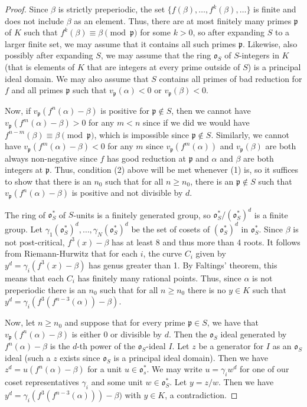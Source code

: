 \documentclass[10pt,a4paper]{amsart}
\newcommand{\fo}{\ensuremath{{\mathfrak{o}}}}
\newcommand{\fp}{\ensuremath{{\mathfrak{p}}}}
\begin{document}
\begin{proof}
  Since $\beta$ is strictly preperiodic, the set $\{ f(\beta), \dots,
  f^k(\beta), \dots \}$ is finite and does not include $\beta$ as an
  element.  Thus, there are at most finitely many primes $\fp$ of $K$
  such that $f^k(\beta) \equiv \beta \pmod {\fp}$ for some $k >
  0$, so after expanding $S$ to a larger finite set, we may assume
  that it contains all such primes $\fp$.  Likewise, also possibly
  after expanding $S$, we may assume that the ring $\fo_S$ of
  $S$-integers in $K$ (that is elements of $K$ that are integers at
  every prime outside of $S$) is a principal ideal domain.  We may
  also assume that $S$ contains all primes of bad reduction for $f$
  and all primes $\fp$ such that $v_\fp(\alpha) < 0$ or $v_\fp(\beta)
  < 0$.  

  Now, if $v_\fp(f^n(\alpha) - \beta)$ is positive  for $\fp
  \notin S$, then we cannot have $v_\fp(f^m(\alpha) - \beta) >
  0$ for any $m < n$ since if we did we would have $f^{n-m}(\beta)
  \equiv \beta \pmod{\fp}$, which is impossible since $\fp \notin
  S$. Similarly, we cannot have $v_\fp(f^m(\alpha) - \beta) <  0$ for
  any $m$ since $v_\fp(f^m(\alpha))$ and $v_\fp(\beta)$ are both always
  non-negative since $f$ has good reduction at $\fp$ and $\alpha$ and
  $\beta$ are both integers at $\fp$.  Thus, condition (2) above will
  be met whenever (1) is, so it suffices to show that there is an
  $n_0$ such that for all $n \geq n_0$, there is an $\fp \notin S$
  such that $v_\fp(f^n(\alpha) - \beta)$ is positive and not
  divisible by $d$.

  The ring of $\fo_S^*$ of $S$-units is a finitely generated group, so
  $\fo_S^* / (\fo_S^*)^d$ is a finite group.  Let
  $\gamma_1(\fo_S^*)^d, \dots, \gamma_N(\fo_S^*)^d$ be
  the set of cosets of $(\fo_S^*)^d$ in $\fo_S^*$.  Since
  $\beta$ is not post-critical, $f^3(x) - \beta$ has at least 8 and
  thus more than 4 roots.  It follows from Riemann-Hurwitz that for
  each $i$, the curve $C_i$ given by $y^d = \gamma_i (f^3(x) - \beta)$
  has genus greater than 1. By Faltings' theorem, this means that each
  $C_i$ has finitely many rational points.  Thus, since $\alpha$ is
  not preperiodic there is an $n_0$ such that for all $n \geq n_0$
  there is no $y \in K$ such that
  $y^d = \gamma_i (f^3(f^{n-3}(\alpha)) - \beta)$.

  Now, let $n \geq n_0$ and suppose that for every prime $\fp \in S$,
  we have that $v_\fp(f^n(\alpha) - \beta)$ is either 0 or divisible
  by $d$.  Then the $\fo_S$ ideal generated by $f^n(\alpha) - \beta$
  is the $d$-th power of the $\fo_S$-ideal $I$.  Let $z$ be a generator
  for $I$ as an $\fo_S$ ideal (such a $z$ exists since $\fo_S$ is a
  principal ideal domain).  Then we have
  $z^d = u (f^n(\alpha) - \beta)$ for a unit $u \in \fo_s^*$.  We may
  write $u = \gamma_i w^d$ for one of our coset representatives
  $\gamma_i$ and some unit $w \in \fo_S^*$.  Let $y = z/w$.  Then we
  have $y^d = \gamma_i (f^3(f^{n-3}(\alpha))) - \beta)$ with $y \in K$,
  a contradiction.


\end{proof}
\end{document}
